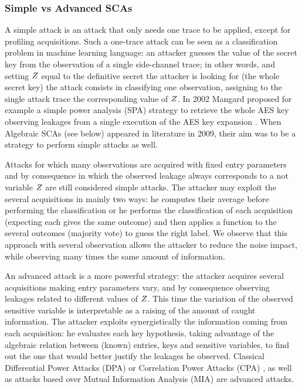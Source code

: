 \subsubsection{Simple vs Advanced SCAs}
A simple attack is an attack that only needs one trace to be applied, except for profiling acquisitions. Such a one-trace attack can be seen as a classification problem in machine learning language: an attacker guesses the value of the secret key from the observation of a single side-channel trace;  in other words, and setting $Z$ equal to the definitive secret the attacker is looking for (\eg the whole secret key) the attack consists in classifying one observation, \ie assigning to the single attack trace the corresponding value of $Z$. In 2002 Mangard \etal proposed for example a simple power analysis (SPA) strategy to retrieve the whole AES key observing leakages from a single execution of the AES key expansion \cite{mangard2002simple}. When Algebraic SCAs (see below) appeared in literature in 2009, their aim was to be a strategy to perform simple attacks as well.  

\begin{remark}
Attacks for which many observations are acquired with fixed entry parameters and by consequence in which the observed leakage always corresponds to a not variable $Z$ are still considered simple attacks. The attacker may exploit the several acquisitions in mainly two ways: he computes their average before performing the classification or he performs the classification of each acquisition (expecting each gives the same outcome) and then applies a function to the several outcomes (\eg majority vote) to guess the right label. We observe that this approach with several observation allows the attacker to reduce the noise impact, while observing many times the same amount of information.
\end{remark}
An advanced attack is a more powerful strategy: the attacker acquires several acquisitions making entry parameters vary, and by consequence observing leakages related to different values of $Z$. This time the variation of the observed sensitive variable is interpretable as a raising of the amount of caught information. The attacker exploits synergistically the information coming from each acquisition: he evaluates each key hypothesis, taking advantage of the algebraic relation between (known) entries, keys and sensitive variables, to find out the one that would better justify the leakages he observed. Classical Differential Power Attacks (DPA) \cite{brier2004correlation} or Correlation Power Attacks (CPA) \cite{brier2004correlation}, as well as attacks based over Mutual Information Analysis (MIA) \cite{batina2011mutual} are advanced attacks. 


